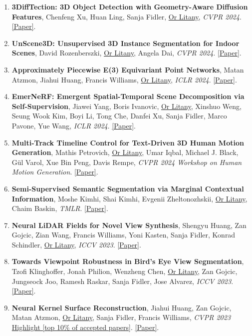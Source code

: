 \begin{enumerate}[leftmargin=*]
    \item \textbf{3DiffTection: 3D Object Detection with Geometry-Aware Diffusion Features}, Chenfeng Xu, Huan Ling, Sanja Fidler, \underline{Or Litany}, \textit{CVPR 2024}. \href{https://arxiv.org/abs/2311.04391}{[Paper]}.
    \item \textbf{UnScene3D: Unsupervised 3D Instance Segmentation for Indoor Scenes}, David Rozenberszki, \underline{Or Litany}, Angela Dai, \textit{CVPR 2024}. \href{https://arxiv.org/abs/2303.14541}{[Paper]}.
    \item \textbf{Approximately Piecewise E(3) Equivariant Point Networks}, Matan Atzmon, Jiahui Huang, Francis Williams, \underline{Or Litany}, \textit{ICLR 2024}. \href{https://arxiv.org/abs/2402.08529}{[Paper]}.
    \item \textbf{EmerNeRF: Emergent Spatial-Temporal Scene Decomposition via Self-Supervision}, Jiawei Yang, Boris Ivanovic, \underline{Or Litany}, Xinshuo Weng, Seung Wook Kim, Boyi Li, Tong Che, Danfei Xu, Sanja Fidler, Marco Pavone, Yue Wang, \textit{ICLR 2024}. \href{https://arxiv.org/abs/2311.02077}{[Paper]}.
    \item \textbf{Multi-Track Timeline Control for Text-Driven 3D Human Motion Generation}, Mathis Petrovich, \underline{Or Litany}, Umar Iqbal, Michael J. Black, Gül Varol, Xue Bin Peng, Davis Rempe, \textit{CVPR 2024 Workshop on Human Motion Generation}. \href{https://arxiv.org/abs/2401.08559}{[Paper]}.
    \item \textbf{Semi-Supervised Semantic Segmentation via Marginal Contextual Information}, Moshe Kimhi, Shai Kimhi, Evgenii Zheltonozhskii, \underline{Or Litany}, Chaim Baskin, \textit{TMLR}. \href{https://arxiv.org/abs/2308.13900}{[Paper]}.
    \item \textbf{Neural LiDAR Fields for Novel View Synthesis}, Shengyu Huang, Zan Gojcic, Zian Wang, Francis Williams, Yoni Kasten, Sanja Fidler, Konrad Schindler, \underline{Or Litany}, \textit{ICCV 2023}. \href{https://arxiv.org/abs/2305.01643}{[Paper]}.
    \item \textbf{Towards Viewpoint Robustness in Bird’s Eye View Segmentation}, Tzofi Klinghoffer, Jonah Philion, Wenzheng Chen, \underline{Or Litany}, Zan Gojcic, Jungseock Joo, Ramesh Raskar, Sanja Fidler, Jose Alvarez, \textit{ICCV 2023}. \href{https://arxiv.org/pdf/2309.05192.pdf}{[Paper]}.
    \item \textbf{Neural Kernel Surface Reconstruction}, Jiahui Huang, Zan Gojcic, Matan Atzmon, \underline{Or Litany}, Sanja Fidler, Francis Williams, \textit{CVPR 2023}\\ \underline{Highlight [top 10\% of accepted papers]}. \href{https://arxiv.org/pdf/2305.19590.pdf}{[Paper]}.

\end{enumerate}
